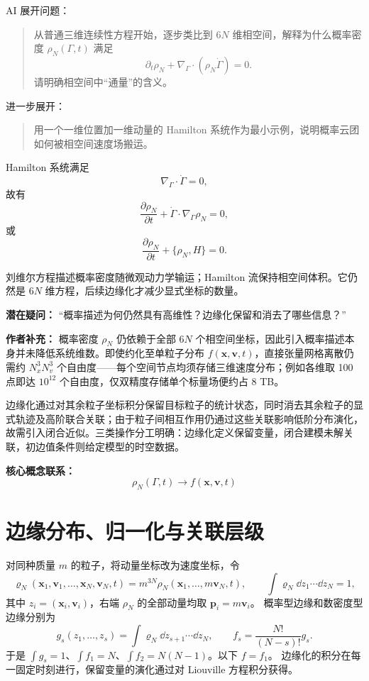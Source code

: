 \begin{askai}
AI 展开问题：
\begin{quote}
从普通三维连续性方程开始，逐步类比到 \(6N\) 维相空间，解释为什么概率密度 \(\rho_N(\Gamma,t)\) 满足
\[
\partial_t\rho_N+\nabla_\Gamma\cdot(\rho_N\dot\Gamma)=0.
\]
请明确相空间中“通量”的含义。
\end{quote}

进一步展开：
\begin{quote}
用一个一维位置加一维动量的 Hamilton 系统作为最小示例，说明概率云团如何被相空间速度场搬运。
\end{quote}
\end{askai}

Hamilton 系统满足
\[
\nabla_\Gamma\cdot\dot\Gamma=0,
\]
故有
\[
\frac{\partial \rho_N}{\partial t}
+
\dot\Gamma\cdot\nabla_\Gamma\rho_N=0,
\]
或
\[
\frac{\partial \rho_N}{\partial t}+\{\rho_N,H\}=0.
\]

刘维尔方程描述概率密度随微观动力学输运；Hamilton 流保持相空间体积。它仍然是 \(6N\) 维方程，后续边缘化才减少显式坐标的数量。

\begin{authornote}
\textbf{潜在疑问：}
“概率描述为何仍然具有高维性？边缘化保留和消去了哪些信息？”

\textbf{作者补充：}
概率密度 \(\rho_N\) 仍依赖于全部 \(6N\) 个相空间坐标，因此引入概率描述本身并未降低系统维数。即使约化至单粒子分布 \(f(\bm x,\bm v,t)\)，直接张量网格离散仍需约 \(N_x^3N_v^3\) 个自由度——每个空间节点均须存储三维速度分布；例如各维取 100 点即达 \(10^{12}\) 个自由度，仅双精度存储单个标量场便约占 8 TB。

边缘化通过对其余粒子坐标积分保留目标粒子的统计状态，同时消去其余粒子的显式轨迹及高阶联合关联；由于粒子间相互作用仍通过这些关联影响低阶分布演化，故需引入闭合近似。三类操作分工明确：边缘化定义保留变量，闭合建模未解关联，初边值条件则给定模型的时空数据。

\textbf{核心概念联系：}
\[
\rho_N(\Gamma,t)
\longrightarrow
f(\bm x,\bm v,t)
\]
\end{authornote}

\section{边缘分布、归一化与关联层级}
对同种质量 $m$ 的粒子，将动量坐标改为速度坐标，令
\[
\varrho_N(\bm x_1,\bm v_1,\ldots,\bm x_N,\bm v_N,t)
=m^{3N}\rho_N(\bm x_1,\ldots,m\bm v_N,t),\qquad
\int\varrho_N\dd z_1\cdots\dd z_N=1,
\]
其中 $z_i=(\bm x_i,\bm v_i)$，右端 $\rho_N$ 的全部动量均取 $\bm p_i=m\bm v_i$。
概率型边缘和数密度型边缘分别为
\[
g_s(z_1,\ldots,z_s)=\int\varrho_N\dd z_{s+1}\cdots\dd z_N,\qquad
f_s=\frac{N!}{(N-s)!}g_s.
\]
于是 $\int g_s=1$、$\int f_1=N$、$\int f_2=N(N-1)$。以下 $f=f_1$。
边缘化的积分在每一固定时刻进行，保留变量的演化通过对 Liouville 方程积分获得。

